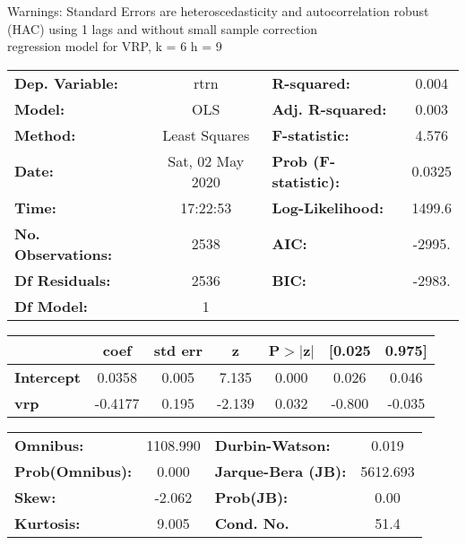 Warnings: \newline
 [1] Standard Errors are heteroscedasticity and autocorrelation robust (HAC) using 1 lags and without small sample correction\\ 

regression model for VRP, k = 6 h = 9\begin{center}
\begin{tabular}{lclc}
\toprule
\textbf{Dep. Variable:}    &       rtrn       & \textbf{  R-squared:         } &     0.004   \\
\textbf{Model:}            &       OLS        & \textbf{  Adj. R-squared:    } &     0.003   \\
\textbf{Method:}           &  Least Squares   & \textbf{  F-statistic:       } &     4.576   \\
\textbf{Date:}             & Sat, 02 May 2020 & \textbf{  Prob (F-statistic):} &   0.0325    \\
\textbf{Time:}             &     17:22:53     & \textbf{  Log-Likelihood:    } &    1499.6   \\
\textbf{No. Observations:} &        2538      & \textbf{  AIC:               } &    -2995.   \\
\textbf{Df Residuals:}     &        2536      & \textbf{  BIC:               } &    -2983.   \\
\textbf{Df Model:}         &           1      & \textbf{                     } &             \\
\bottomrule
\end{tabular}
\begin{tabular}{lcccccc}
                   & \textbf{coef} & \textbf{std err} & \textbf{z} & \textbf{P$> |$z$|$} & \textbf{[0.025} & \textbf{0.975]}  \\
\midrule
\textbf{Intercept} &       0.0358  &        0.005     &     7.135  &         0.000        &        0.026    &        0.046     \\
\textbf{vrp}       &      -0.4177  &        0.195     &    -2.139  &         0.032        &       -0.800    &       -0.035     \\
\bottomrule
\end{tabular}
\begin{tabular}{lclc}
\textbf{Omnibus:}       & 1108.990 & \textbf{  Durbin-Watson:     } &    0.019  \\
\textbf{Prob(Omnibus):} &   0.000  & \textbf{  Jarque-Bera (JB):  } & 5612.693  \\
\textbf{Skew:}          &  -2.062  & \textbf{  Prob(JB):          } &     0.00  \\
\textbf{Kurtosis:}      &   9.005  & \textbf{  Cond. No.          } &     51.4  \\
\bottomrule
\end{tabular}
\end{center}

